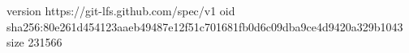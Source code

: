 version https://git-lfs.github.com/spec/v1
oid sha256:80e261d454123aaeb49487e12f51c701681fb0d6c09dba9ce4d9420a329b1043
size 231566
